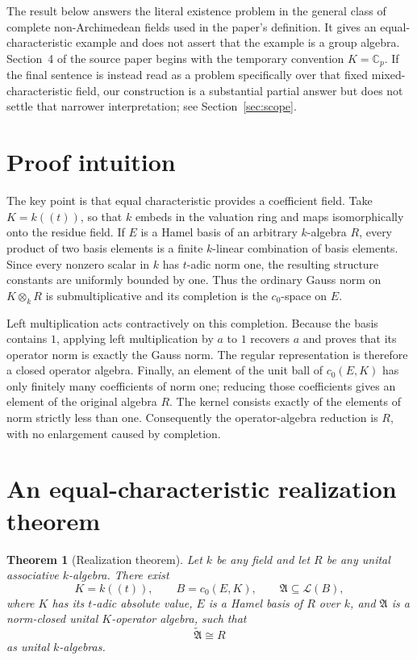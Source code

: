 \documentclass[11pt]{article}
\newtheorem{theorem}{Theorem}
\newcommand{\cA}{\mathfrak A}
\newcommand{\cL}{\mathcal L}
\begin{document}
The result below answers the literal existence problem in the general
class of complete non-Archimedean fields used in the paper's definition.
It gives an equal-characteristic example and does not assert that the
example is a group algebra.  Section~4 of the source paper begins with the
temporary convention $K=\mathbb C_p$.  If the final sentence is instead
read as a problem specifically over that fixed mixed-characteristic
field, our construction is a substantial partial answer but does not
settle that narrower interpretation; see Section~\ref{sec:scope}.

\section{Proof intuition}

The key point is that equal characteristic provides a coefficient field.
Take $K=k((t))$, so that $k$ embeds in the valuation ring and maps
isomorphically onto the residue field.  If $E$ is a Hamel basis of an
arbitrary $k$-algebra $R$, every product of two basis elements is a finite
$k$-linear combination of basis elements.  Since every nonzero scalar in
$k$ has $t$-adic norm one, the resulting structure constants are uniformly
bounded by one.  Thus the ordinary Gauss norm on $K\otimes_kR$ is
submultiplicative and its completion is the $c_0$-space on $E$.

Left multiplication acts contractively on this completion.  Because the
basis contains $1$, applying left multiplication by $a$ to $1$ recovers
$a$ and proves that its operator norm is exactly the Gauss norm.  The
regular representation is therefore a closed operator algebra.  Finally,
an element of the unit ball of $c_0(E,K)$ has only finitely many
coefficients of norm one; reducing those coefficients gives an element of
the original algebra $R$.  The kernel consists exactly of the elements of
norm strictly less than one.  Consequently the operator-algebra reduction
is $R$, with no enlargement caused by completion.

\section{An equal-characteristic realization theorem}

\begin{theorem}[Realization theorem]\label{thm:realization}
Let $k$ be any field and let $R$ be any unital associative $k$-algebra.
There exist
\[
 K=k((t)),\qquad B=c_0(E,K),\qquad
 \cA\subseteq\cL(B),
\]
where $K$ has its $t$-adic absolute value, $E$ is a Hamel basis of $R$ over
$k$, and $\cA$ is a norm-closed unital $K$-operator algebra, such that
\[
 \widetilde{\cA}\cong R
\]
as unital $k$-algebras.
\end{theorem}
\end{document}
